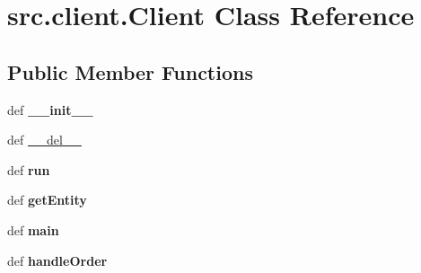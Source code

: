 \hypertarget{classsrc_1_1client_1_1_client}{\section{src.\-client.\-Client \-Class \-Reference}
\label{classsrc_1_1client_1_1_client}
}
\subsection*{\-Public \-Member \-Functions}
\begin{DoxyCompactItemize}
\item 
\hypertarget{classsrc_1_1client_1_1_client_a63e0fbe31d7c47f64ef4e12628f0006f}{def {\bfseries \-\_\-\-\_\-init\-\_\-\-\_\-}}\label{classsrc_1_1client_1_1_client_a63e0fbe31d7c47f64ef4e12628f0006f}

\item 
def \hyperlink{classsrc_1_1client_1_1_client_aece67fa18be912de2d7e04840f63d161}{\-\_\-\-\_\-del\-\_\-\-\_\-}
\item 
\hypertarget{classsrc_1_1client_1_1_client_a354370a9ad5054293c75e74e79c22280}{def {\bfseries run}}\label{classsrc_1_1client_1_1_client_a354370a9ad5054293c75e74e79c22280}

\item 
\hypertarget{classsrc_1_1client_1_1_client_a86bb6abdd2ee3bdebf7c1ae6623f3c82}{def {\bfseries get\-Entity}}\label{classsrc_1_1client_1_1_client_a86bb6abdd2ee3bdebf7c1ae6623f3c82}

\item 
\hypertarget{classsrc_1_1client_1_1_client_a242c260cadbbe69cd687e406e83e0467}{def {\bfseries main}}\label{classsrc_1_1client_1_1_client_a242c260cadbbe69cd687e406e83e0467}

\item 
\hypertarget{classsrc_1_1client_1_1_client_af341ac55e0b5212451476ea2f69b45e7}{def {\bfseries handle\-Order}}\label{classsrc_1_1client_1_1_client_af341ac55e0b5212451476ea2f69b45e7}

\end{DoxyCompactItemize}
